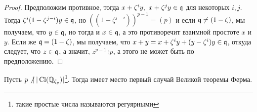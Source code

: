  	\begin{proof}
 		Предположим противное, тогда $x + \zeta^i y, \ x + \zeta^{j} y \in \mathfrak{q}$ для некоторых $i, j$. Тогда $\zeta^i(1 - \zeta^{j - i}) y \in \mathfrak{q}$, но $((1 - \zeta^{j - i}))^{p - 1} = (p)$ и если $\mathfrak{q} \neq (1 - \zeta)$, мы получаем, что $y \in \mathfrak{q}$, но тогда и $x \in \mathfrak{q}$, а это противоречит взаимной простоте $x$ и $y$. Если же $\mathfrak{q} = (1 - \zeta)$, мы получаем, что $x + y = x + \zeta^{i}y + (y - \zeta^{i})y \in \mathfrak{q}$, откуда следует, что $z \in \mathfrak{q}$, а значит, $z^{p - 1} \ \vdots p$, а этого не может быть по предположению. 
 	\end{proof}


 	\begin{theorem} 
 		Пусть $p \not \ \mid |\operatorname{Cl}(\mathbb{Q}_{\zeta_{p}})|$\footnote{такие простые числа называются регуярными}. Тогда имеет место первый случай Великой теоремы Ферма.  
 	\end{theorem}
